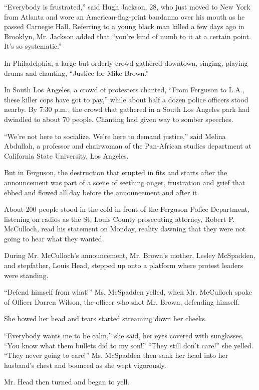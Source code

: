``Everybody is frustrated,'' said Hugh Jackson, 28, who just moved to
New York from Atlanta and wore an American-flag-print bandanna over his
mouth as he passed Carnegie Hall. Referring to a young black man killed
a few days ago in Brooklyn, Mr. Jackson added that ``you're kind of numb
to it at a certain point. It's so systematic.''

In Philadelphia, a large but orderly crowd gathered downtown, singing,
playing drums and chanting, ``Justice for Mike Brown.''

In South Los Angeles, a crowd of protesters chanted, ``From Ferguson to
L.A., these killer cops have got to pay,'' while about half a dozen
police officers stood nearby. By 7:30 p.m., the crowd that gathered in a
South Los Angeles park had dwindled to about 70 people. Chanting had
given way to somber speeches.

``We're not here to socialize. We're here to demand justice,'' said
Melina Abdullah, a professor and chairwoman of the Pan-African studies
department at California State University, Los Angeles.

But in Ferguson, the destruction that erupted in fits and starts after
the announcement was part of a scene of seething anger, frustration and
grief that ebbed and flowed all day before the announcement and after
it.

About 200 people stood in the cold in front of the Ferguson Police
Department, listening on radios as the St. Louis County prosecuting
attorney, Robert P. McCulloch, read his statement on Monday, reality
dawning that they were not going to hear what they wanted.

During Mr. McCulloch's announcement, Mr. Brown's mother, Lesley
McSpadden, and stepfather, Louis Head, stepped up onto a platform where
protest leaders were standing.

``Defend himself from what!'' Ms. McSpadden yelled, when Mr. McCulloch
spoke of Officer Darren Wilson, the officer who shot Mr. Brown,
defending himself.

She bowed her head and tears started streaming down her cheeks.

``Everybody wants me to be calm,'' she said, her eyes covered with
sunglasses. ``You know what them bullets did to my son!'' ``They still
don't care!'' she yelled. ``They never going to care!'' Ms. McSpadden
then sank her head into her husband's chest and bounced as she wept
vigorously.

Mr. Head then turned and began to yell.

